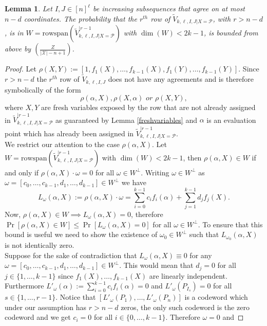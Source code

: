 \documentclass[draft, onecolumn, 11pt]{IEEEtran}
\newtheorem{lemma}[theorem]{Lemma}
\begin{document}
\begin{lemma}\label{rowinaboverows}
    Let $I,J \in [n]^\ell$ be increasing subsequences that agree on at most $n - d$ coordinates. The probability that the $r^{th}$ row of $\widetilde{V}_{k,\ell,I,J|X = \mathcal{P}}$, with $r > n-d$, is in $W = \mathrm{rowspan}(\widetilde{V}_{k,\ell,I,J|X = \mathcal{P}}^{|r-1})$ with $\dim(W) < 2k-1$, is bounded from above by $\left(\frac{Z}{|\mathcal{X}| - n + 1}\right)$.
\end{lemma}
\begin{proof}
    Let $\rho(X,Y):= [1, f_1(X), \dots, f_{k-1}(X), f_1(Y), \dots, f_{k-1}(Y)]$.
    Since $r > n - d$ the $r^{th}$ row of $\widetilde{V}_{k,\ell,I,J}$ does not have any agreements and is therefore symbolically of the form $$\rho(\alpha, X), \rho(X,\alpha) \textit{ or } \rho(X,Y),$$
    where $X,Y$ are fresh variables exposed by the row that are not already assigned in $\widetilde{V}_{k,\ell,I,J|X = \mathcal{P}}^{|r-1}$ as guaranteed by Lemma \ref{freshvariables} and $\alpha$ is an evaluation point which has already been assigned in $\widetilde{V}_{k,\ell,I,J|X = \mathcal{P}}^{|r-1}$.
    \\
    We restrict our attention to the case $\rho(\alpha, X)$. Let $W = \mathrm{rowspan}(\widetilde{V}_{k,\ell,I,J|X = \mathcal{P}}^{|r-1})$ with $\dim(W) < 2k-1$, then $\rho(\alpha,X) \in W$ if and only if $\rho(\alpha, X)\cdot \omega = 0$ for all $\omega \in W^\bot$. Writing $\omega \in W^{\bot}$ as $\omega = [c_0, \dots, c_{k-1}, d_1, \dots, d_{k-1}] \in W^{\bot}$ we have 
    $$L_\omega(\alpha, X):=  \rho(\alpha, X) \cdot \omega = \sum_{i = 0}^{k-1}c_i f_i(\alpha) + \sum_{j = 1}^{k-1}d_j f_j(X).$$
    Now, $\rho(\alpha,X) \in W \implies L_{\omega}(\alpha, X) = 0$, therefore $\Pr[\rho(\alpha,X) \in W] \leq \Pr[L_\omega(\alpha, X) = 0]$ for all $\omega \in W^\bot$. To ensure that this bound is useful we need to show the existence of $\omega_0 \in W^\bot$ such that $L_{\omega_0}(\alpha, X)$ is not identically zero. 
    \\
    Suppose for the sake of contradiction that $L_{\omega}(\alpha, X) \equiv 0$ for any $\omega = [c_0, \dots, c_{k-1}, d_1, \dots, d_{k-1}] \in W^\bot$. This would mean that $d_j = 0$ for all $j \in \{1, \dots, k-1\}$ since $f_1(X), \dots, f_{k-1}(X)$ are linearly independent. Furthermore $L'_{\omega}(\alpha) := \sum_{i = 0}^{k-1}c_i f_i(\alpha) = 0$ and $L'_\omega(P_{I_s}) = 0$ for all $s \in \{1, \dots, r-1\}$. Notice that $[L'_\omega(P_1), \dots, L'_\omega(P_n)]$ is a codeword which under our assumption has $r > n - d$ zeros, the only such codeword is the zero codeword and we get $c_i = 0$ for all $i \in \{0, \dots, k-1\}$. Therefore $\omega = 0$ and

\end{proof}
\end{document}

